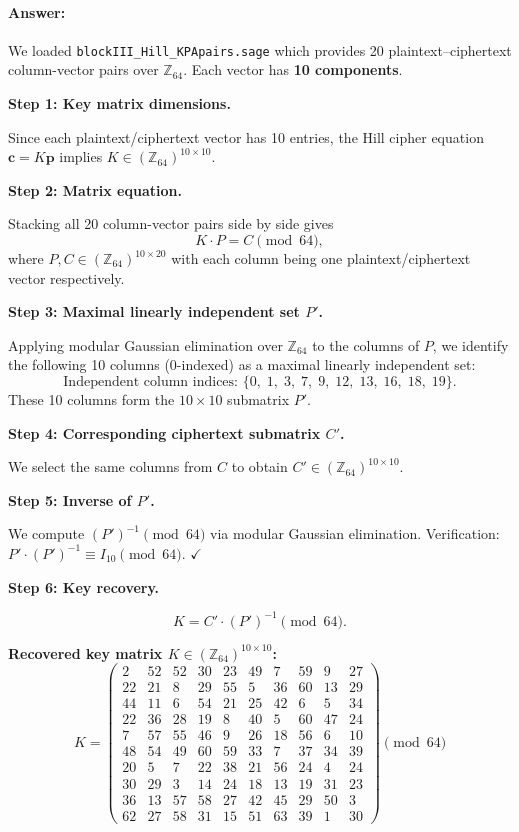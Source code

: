 \documentclass[]{scrartcl}
\newcommand{\filename}[1]{\texttt{#1}}
\begin{document}
\paragraph{Answer:}

We loaded \filename{blockIII\_Hill\_KPApairs.sage} which provides 20 plaintext--ciphertext column-vector pairs over $\mathbb{Z}_{64}$. Each vector has \textbf{10 components}.

\medskip
\noindent\textbf{Step 1: Key matrix dimensions.}

Since each plaintext/ciphertext vector has 10 entries, the Hill cipher equation $\mathbf{c} = K\mathbf{p}$ implies $K \in (\mathbb{Z}_{64})^{10\times 10}$.

\medskip
\noindent\textbf{Step 2: Matrix equation.}

Stacking all 20 column-vector pairs side by side gives
\[
K \cdot P = C \pmod{64},
\]
where $P,C \in (\mathbb{Z}_{64})^{10\times 20}$ with each column being one plaintext/ciphertext vector respectively.

\medskip
\noindent\textbf{Step 3: Maximal linearly independent set $P'$.}

Applying modular Gaussian elimination over $\mathbb{Z}_{64}$ to the columns of $P$, we identify the following 10 columns (0-indexed) as a maximal linearly independent set:
\[
\text{Independent column indices: } \{0,\;1,\;3,\;7,\;9,\;12,\;13,\;16,\;18,\;19\}.
\]
These 10 columns form the $10\times 10$ submatrix $P'$.

\medskip
\noindent\textbf{Step 4: Corresponding ciphertext submatrix $C'$.}

We select the same columns from $C$ to obtain $C' \in (\mathbb{Z}_{64})^{10\times 10}$.

\medskip
\noindent\textbf{Step 5: Inverse of $P'$.}

We compute $(P')^{-1} \pmod{64}$ via modular Gaussian elimination. Verification: $P' \cdot (P')^{-1} \equiv I_{10} \pmod{64}$. $\checkmark$

\medskip
\noindent\textbf{Step 6: Key recovery.}

\[
K = C' \cdot (P')^{-1} \pmod{64}.
\]

\textbf{Recovered key matrix $K \in (\mathbb{Z}_{64})^{10\times10}$:}
\[
K =
\begin{pmatrix}
 2 & 52 & 52 & 30 & 23 & 49 &  7 & 59 &  9 & 27 \\
22 & 21 &  8 & 29 & 55 &  5 & 36 & 60 & 13 & 29 \\
44 & 11 &  6 & 54 & 21 & 25 & 42 &  6 &  5 & 34 \\
22 & 36 & 28 & 19 &  8 & 40 &  5 & 60 & 47 & 24 \\
 7 & 57 & 55 & 46 &  9 & 26 & 18 & 56 &  6 & 10 \\
48 & 54 & 49 & 60 & 59 & 33 &  7 & 37 & 34 & 39 \\
20 &  5 &  7 & 22 & 38 & 21 & 56 & 24 &  4 & 24 \\
30 & 29 &  3 & 14 & 24 & 18 & 13 & 19 & 31 & 23 \\
36 & 13 & 57 & 58 & 27 & 42 & 45 & 29 & 50 &  3 \\
62 & 27 & 58 & 31 & 15 & 51 & 63 & 39 &  1 & 30
\end{pmatrix}
\pmod{64}
\]
\end{document}
